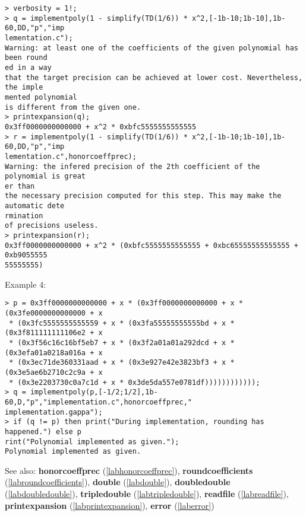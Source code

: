 \begin{center}\begin{minipage}{15cm}\begin{Verbatim}[frame=single]
> verbosity = 1!;
> q = implementpoly(1 - simplify(TD(1/6)) * x^2,[-1b-10;1b-10],1b-60,DD,"p","imp
lementation.c");
Warning: at least one of the coefficients of the given polynomial has been round
ed in a way
that the target precision can be achieved at lower cost. Nevertheless, the imple
mented polynomial
is different from the given one.
> printexpansion(q);
0x3ff0000000000000 + x^2 * 0xbfc5555555555555
> r = implementpoly(1 - simplify(TD(1/6)) * x^2,[-1b-10;1b-10],1b-60,DD,"p","imp
lementation.c",honorcoeffprec);
Warning: the infered precision of the 2th coefficient of the polynomial is great
er than
the necessary precision computed for this step. This may make the automatic dete
rmination
of precisions useless.
> printexpansion(r);
0x3ff0000000000000 + x^2 * (0xbfc5555555555555 + 0xbc65555555555555 + 0xb9055555
55555555)
\end{Verbatim}
\end{minipage}\end{center}
\noindent Example 4: 
\begin{center}\begin{minipage}{15cm}\begin{Verbatim}[frame=single]
> p = 0x3ff0000000000000 + x * (0x3ff0000000000000 + x * (0x3fe0000000000000 + x
 * (0x3fc5555555555559 + x * (0x3fa55555555555bd + x * (0x3f811111111106e2 + x
 * (0x3f56c16c16bf5eb7 + x * (0x3f2a01a01a292dcd + x * (0x3efa01a0218a016a + x
 * (0x3ec71de360331aad + x * (0x3e927e42e3823bf3 + x * (0x3e5ae6b2710c2c9a + x
 * (0x3e2203730c0a7c1d + x * 0x3de5da557e0781df))))))))))));
> q = implementpoly(p,[-1/2;1/2],1b-60,D,"p","implementation.c",honorcoeffprec,"
implementation.gappa");
> if (q != p) then print("During implementation, rounding has happened.") else p
rint("Polynomial implemented as given.");    
Polynomial implemented as given.
\end{Verbatim}
\end{minipage}\end{center}
See also: \textbf{honorcoeffprec} (\ref{labhonorcoeffprec}), \textbf{roundcoefficients} (\ref{labroundcoefficients}), \textbf{double} (\ref{labdouble}), \textbf{doubledouble} (\ref{labdoubledouble}), \textbf{tripledouble} (\ref{labtripledouble}), \textbf{readfile} (\ref{labreadfile}), \textbf{printexpansion} (\ref{labprintexpansion}), \textbf{error} (\ref{laberror})
